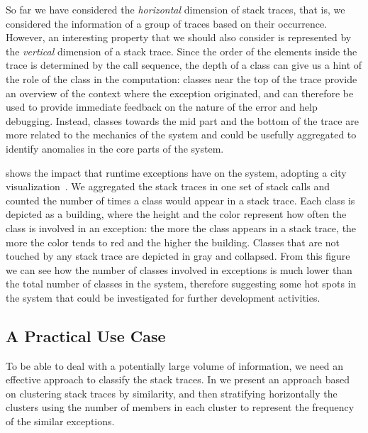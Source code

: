 So far we have considered the \emph{horizontal} dimension of stack traces, that is, we considered the information of a group of traces based on their occurrence.
However, an interesting property that we should also consider is represented by the \emph{vertical} dimension of a stack trace.
Since the order of the elements inside the trace is determined by the call sequence, the depth of a class can give us a hint of the role of the class in the computation: classes near the top of the trace provide an overview of the context where the exception originated, and can therefore be used to provide immediate feedback on the nature of the error and help debugging.
Instead, classes towards the mid part and the bottom of the trace are more related to the mechanics of the system and could be usefully aggregated to identify anomalies in the core parts of the system.

 shows the impact that runtime exceptions have on the \pha system, adopting a city visualization~\cite{Wett2011a}.
We aggregated the stack traces in one set of stack calls and counted the number of times a class would appear in a stack trace.
Each class is depicted as a building, where the height and the color represent how often the class is involved in an exception: the more the class appears in a stack trace, the more the color tends to red and the higher the building.
Classes that are not touched by any stack trace are depicted in gray and collapsed.
From this figure we can see how the number of classes involved in exceptions is much lower than the total number of classes in the system, therefore suggesting some hot spots in the system that could be investigated for further development activities.

\subsection{A Practical Use Case}

To be able to deal with a potentially large volume of information, we need an effective approach to classify the stack traces.
In  we present an approach based on clustering stack traces by similarity, and then stratifying horizontally the clusters using the number of members in each cluster to represent the frequency of the similar exceptions.

